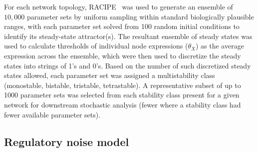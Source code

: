 \documentclass[11pt]{article}
\begin{document}
For each network topology, RACIPE~\cite{Huang2017} was used to generate an ensemble of $10{,}000$ parameter sets by uniform sampling within standard biologically plausible ranges, with each parameter set solved from 100 random initial conditions to identify its steady-state attractor(s). The resultant ensemble of steady states was used to calculate thresholds of individual node expressions ($\theta_X$) as the average expression across the ensemble, which were then used to discretize the steady states into strings of 1's and 0's. Based on the number of such discretized steady states allowed, each parameter set was assigned a multistability class (monostable, bistable, tristable, tetrastable). A representative subset of up to 1000 parameter sets was selected from each stability class present for a given network for downstream stochastic analysis (fewer where a stability class had fewer available parameter sets).

\subsection{Regulatory noise model} \label{sec:noise}
\end{document}
